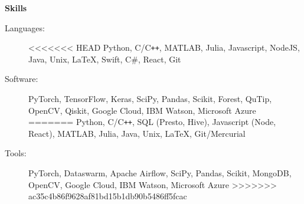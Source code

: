 \documentclass[letterpaper, 8pt]{extarticle}
\newcommand{\resheading}[1]{{\large \colorbox{mygrey}{\begin{minipage}{0.99\textwidth}{\textbf{#1 \vphantom{p\^{E}}}}\end{minipage}}}}
\begin{document}
\resheading{Skills}
\begin{description}
\item[Languages:]
<<<<<<< HEAD
Python, C/C{}\verb!++!, MATLAB, Julia, Javascript, NodeJS, Java, Unix, \LaTeX, Swift, C\#, React, Git
\item[Software:]
PyTorch, TensorFlow, Keras, SciPy, Pandas, Scikit, Forest, QuTip, OpenCV, Qiskit, Google Cloud, IBM Watson, Microsoft Azure
=======
Python, C/C{}\verb!++!, SQL (Presto, Hive), Javascript (Node, React),  MATLAB, Julia, Java, Unix, \LaTeX, Git/Mercurial
\item[Tools:]
PyTorch, Dataswarm, Apache Airflow, SciPy, Pandas, Scikit, MongoDB, OpenCV, Google Cloud, IBM Watson, Microsoft Azure
>>>>>>> ac35c4b86f9628af81bd15b1db90b5486ff5fcac
\end{description}
\end{document}
